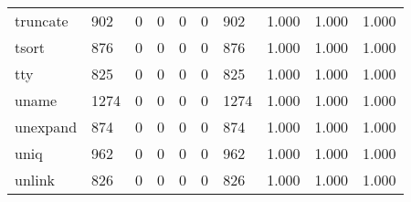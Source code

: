 \begin{longtable}{lp{1.3cm}p{1.3cm}p{1.3cm}p{1.3cm}p{1.3cm}p{1.3cm}p{1.3cm}p{1.3cm}p{1.3cm}}
truncate  &                    902 &                                  0 &                                 0 &                                0 &                                 0 &                             902 &                                   1.000 &                                  1.000 &                                1.000 \\
tsort     &                    876 &                                  0 &                                 0 &                                0 &                                 0 &                             876 &                                   1.000 &                                  1.000 &                                1.000 \\
tty       &                    825 &                                  0 &                                 0 &                                0 &                                 0 &                             825 &                                   1.000 &                                  1.000 &                                1.000 \\
uname     &                   1274 &                                  0 &                                 0 &                                0 &                                 0 &                            1274 &                                   1.000 &                                  1.000 &                                1.000 \\
unexpand  &                    874 &                                  0 &                                 0 &                                0 &                                 0 &                             874 &                                   1.000 &                                  1.000 &                                1.000 \\
uniq      &                    962 &                                  0 &                                 0 &                                0 &                                 0 &                             962 &                                   1.000 &                                  1.000 &                                1.000 \\
unlink    &                    826 &                                  0 &                                 0 &                                0 &                                 0 &                             826 &                                   1.000 &                                  1.000 &                                1.000 \\

\end{longtable}
